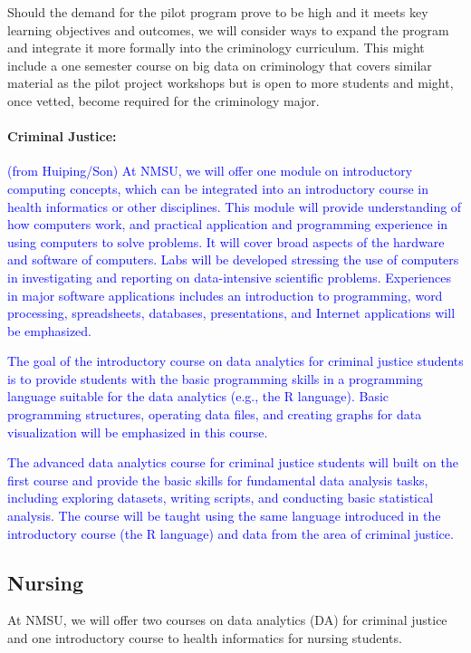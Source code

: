 Should the demand for the pilot program prove to be high and it meets key learning objectives and outcomes, we will consider ways to expand the program and integrate it more formally into the criminology curriculum. This might include a one semester course on big data on criminology that covers similar material as the pilot project workshops but is open to more students and might, once vetted, become required for the criminology major. 

\paragraph{Criminal Justice:}
\textcolor{blue}{(from Huiping/Son)  At NMSU, we will offer one module on introductory computing concepts, which can be integrated into an introductory course in health informatics or other disciplines.  
This module will provide understanding of how computers work, and practical application and programming experience in using computers to solve problems. It will cover broad aspects of the hardware and software of computers. Labs will be developed stressing the use of computers in investigating and reporting on data-intensive scientific problems. Experiences in  major software applications includes an introduction to programming, word processing, spreadsheets, databases, presentations, and Internet applications will be emphasized. 
}

\textcolor{blue}{The goal of the introductory course on data analytics for criminal justice students is to provide students with the basic programming 
skills in a programming language suitable for the data analytics (e.g., the R language). Basic programming structures, operating data files, and creating graphs for data visualization will be emphasized in this course.  }

\textcolor{blue}{The advanced data analytics course for criminal justice students will built on the first course and provide the basic skills for fundamental data analysis tasks, including exploring datasets, writing scripts, and conducting basic statistical analysis. The course will be taught using the same language introduced in the introductory course (the R language) and data from the 
area of criminal justice. }

\subsection{Nursing}
\label{sec:research:nursing}
At NMSU, we will offer two courses on data analytics (DA) for criminal justice and one introductory course to health informatics for nursing students. 

